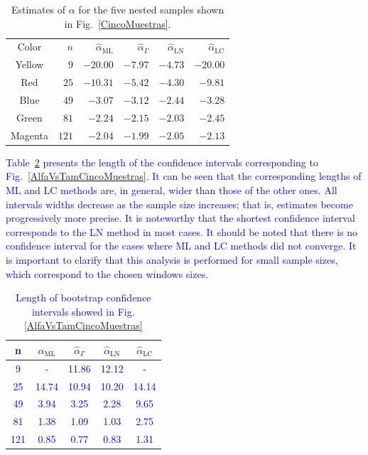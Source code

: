 \documentclass[twocolumn]{svjour3}
\begin{document}
\begin{table}[hbt]
	\centering
	\caption{Estimates of ${\alpha}$ for the five nested samples shown in Fig.~\ref{CincoMuestras}.}\label{TablaCincoMuestras} 
	\begin{tabular}{c*5{r}}
		\toprule
		Color       &  $n$    &  $\widehat{\alpha}_{\text{{ML}}}$    &  $\widehat{\alpha}_{\Gamma}$  &  $\widehat{\alpha}_{\text{{LN}}}$ &  $\widehat{\alpha}_{\text{{LC}}}$\\
		\cmidrule(lr){1-6}
		Yellow      & $9$     & $-20.00$      & $-7.97$ & $-4.73$ & $-20.00$\\
		Red         & $25$    & $-10.31$  & $-5.42$ & $-4.30$ & $-9.81$\\
		Blue        & $49$    & $-3.07$   & $-3.12$ & $-2.44$ & $-3.28$\\
		Green       & $81$    & $-2.24$   & $-2.15$ & $-2.03$ & $-2.45$\\
		Magenta     & $121$   & $-2.04$   & $-1.99$ & $-2.05$ & $-2.13$\\
		\bottomrule
	\end{tabular}
\end{table}

\textcolor{blue}{
Table~\ref{tab:LongIC} presents the length of the confidence intervals corresponding to Fig.~\ref{AlfaVsTamCincoMuestras}. It can be seen that the corresponding lengths of ML and LC methods are, in general, wider than those of the other ones. All intervals widths decrease as the sample size increases; that is, estimates become progressively more precise. 
It is noteworthy that the shortest confidence interval corresponds to the LN method in most cases. 
It should be noted that there is no confidence interval for the cases where ML and LC methods did not converge.
It is important to clarify that this analysis is performed for small sample sizes, which correspond to the chosen windows sizes. 
}

\begin{table}[htbp]
	\centering
	\caption{\label{tab:LongIC}Length of bootstrap confidence intervals showed in Fig.\ref{AlfaVsTamCincoMuestras}}
	\textcolor{blue}{
	\begin{tabular}{ccccc}
		\toprule 
		n     &  $\widehat{\alpha}_{\text{{ML}}}$    &  $\widehat{\alpha}_{\Gamma}$  &  $\widehat{\alpha}_{\text{{LN}}}$ &  $\widehat{\alpha}_{\text{{LC}}}$ \\
		\midrule
		9     &    -  & 11.86 & 12.12 & - \\
		25    & 14.74 & 10.94 & 10.20 & 14.14 \\
		49    & 3.94  & 3.25  & 2.28  & 9.65 \\
		81    & 1.38  & 1.09  & 1.03  & 2.75 \\
		121   & 0.85  & 0.77  & 0.83  & 1.31 \\
		\bottomrule
	\end{tabular}
}
\end{table}%
\end{document}
